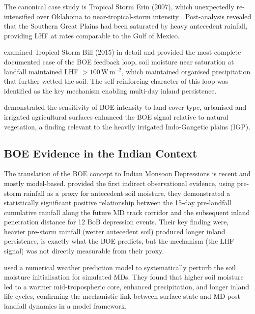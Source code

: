 The canonical case study is Tropical Storm Erin (2007), which
unexpectedly re-intensified over Oklahoma to near-tropical-storm
intensity \citep{andersen2014insights}. Post-analysis revealed that
the Southern Great Plains had been saturated by heavy antecedent
rainfall, providing LHF at rates comparable to the Gulf of Mexico.

\citet{wakefield2021} examined Tropical Storm Bill (2015) in detail
and provided the most complete documented case of the BOE feedback
loop, soil moisture near saturation at landfall maintained LHF
$>100$\,W\,m$^{-2}$, %
which maintained organised precipitation that further wetted the
soil. The self-reinforcing character of this loop was identified as
the key mechanism enabling multi-day inland persistence.

\citet{nair2019influence} demonstrated the sensitivity of BOE
intensity to land cover type, urbanised and irrigated agricultural
surfaces enhanced the BOE signal relative to natural vegetation, a
finding relevant to the heavily irrigated Indo-Gangetic plains (IGP).

\subsection{BOE Evidence in the Indian Context}
\label{subsec:boe_india}

The translation of the BOE concept to Indian Monsoon Depressions is
recent and mostly model-based. \citet{kishtawal2013enhancement}
provided the first indirect observational evidence, using pre-storm
rainfall as a proxy for antecedent soil moisture, they demonstrated a
statistically significant positive relationship between the 15-day
pre-landfall cumulative rainfall along the future MD track corridor
and the subsequent inland penetration distance for 12 BoB depression
events. Their key finding were, heavier pre-storm rainfall (wetter
antecedent soil) produced longer inland persistence, is exactly what
the BOE predicts, but the mechanism (the LHF signal) was not directly
measurable from their proxy.

\citet{hunt2017effect} used a numerical weather prediction model to
systematically perturb the soil moisture initialisation for simulated
MDs. They found that higher soil moisture led to a warmer
mid-tropospheric core, enhanced precipitation, and longer inland life
cycles, confirming the mechanistic link between surface state and MD
post-landfall dynamics in a model framework.

